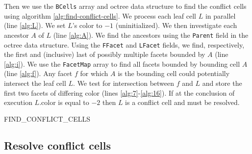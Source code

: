 \documentclass[submission]{gmp2017}
\begin{document}
Then we use the \texttt{BCells} array and octree data structure to find the conflict cells using algorithm \ref{alg:find-conflict-cells}. We process each leaf cell $L$ in parallel (line \ref{alg:L}). We set $L$'s color to $-1$ (uninitialized). We then investigate each ancestor $A$ of $L$ (line \ref{alg:A}). We find the ancestors using the \texttt{Parent} field in the octree data structure. Using the \texttt{FFacet} and \texttt{LFacet} fields, we find, respectively, the first and (inclusive) last of possibly multiple facets bounded by $A$ (line \ref{alg:i}). We use the \texttt{FacetMap} array to find all facets bounded by bounding cell $A$ (line \ref{alg:f}). Any facet $f$ for which $A$ is the bounding cell could potentially intersect the leaf cell $L$. We test for intersection between $f$ and $L$ and store the first two facets of differing color (lines \ref{alg:7}-\ref{alg:16}). If at the conclusion of execution $L$.color is equal to $-2$ then $L$ is a conflict cell and must be resolved.

\algorithmspace
\begin{algorithm}
  \DontPrintSemicolon
  \LinesNumbered
  \BlankLine
  \ForPar{leaf cell $L$}{ \label{alg:L}
    $L$.color = -1\;
    \ForEach{cell $A$ in \directAncestors{$L$}}{  \label{alg:A}
      \ForEach{i in \{FFacet[A]$\dots$LFacet[A]\}}{ \label{alg:i}
        $f$ := Facets[FacetMap[i]]\; \label{alg:f}
        \If{$f$ intersects $L$}{ \label{alg:7}
          \If{$L$.color == -1} {
            $L$.color = $f$.color\;
            $L$.facet[0] = $f$\;
          }
          \ElseIf{$L$.color $\ne$ $f$.color} {
            $L$.color = -2\;
            $L$.facet[1] = $f$\;
          }
        } \label{alg:16}
      }
    }
  }
\caption{FIND\_CONFLICT\_CELLS}
\label{alg:find-conflict-cells}
\end{algorithm}
\algorithmspace

\subsection{Resolve conflict cells}
\end{document}
